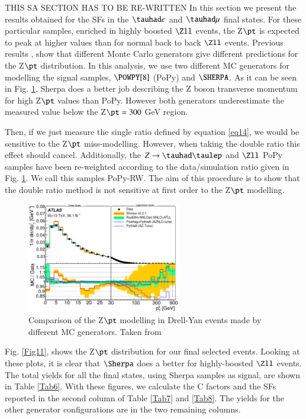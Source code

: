 THIS SA SECTION HAS TO BE RE-WRITTEN In this section we present the results obtained for the SFs in the $\tauhad e$ and $\tauhad \mu$ final states. For these particular samples, enriched in highly boosted $\Zll$ events, the Z$\pt$ is expected to peak at higher values than for normal back to back $\Zll$ events. Previous results \cite{Aad:2019wmn}, show that different Monte Carlo generators give different predictions for the Z$\pt$ distribution. In this analysis, we use two different MC generators for modelling the signal samples, $\POWPY[8]$ (PoPy) and $\SHERPA$. As it can be seen in Fig. \ref{Fig10}, Sherpa does a better job describing the Z boson transverse momentum for high Z$\pt$ values than PoPy. However both generators underestimate the measured value below the Z$\pt=300$ GeV region. 

Then, if we just measure the single ratio defined by equation \ref{eq14}, we would be sensitive to the Z$\pt$ miss-modelling. However, when taking the double ratio this effect should cancel. Additionally, the $Z\to\tauhad\taulep$ and $\Zll$ PoPy samples have been re-weighted according to the data/simulation ratio given in Fig. \ref{Fig10}. We call this samples PoPy-RW. The aim of this procedure is to show that the double ratio method is not sensitive at first order to the Z$\pt$ modelling.

\begin{figure}[htbp]
	\centering
	\includegraphics[width=0.6\textwidth]{figures/Fig10}
	\caption{Comparison of the Z$\pt$ modelling in Drell-Yan events made by different MC generators. Taken from \cite{Aad:2019wmn}}
	\label{Fig10}
\end{figure}

Fig. \ref{Fig11}, shows the Z$\pt$ distribution for our final selected events. Looking at these plots, it is clear that $\Sherpa$ does a better for highly-boosted $\Zll$ events. The total yields for all the final states, using Sherpa samples as signal, are shown in Table \ref{Tab6}. With these figures, we calculate the C factors and the SFs reported in the second column of Table \ref{Tab7} and \ref{Tab8}. The yields for the other generator configurations are in the two remaining columns.

